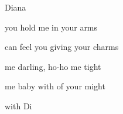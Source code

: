\begin{SBSong}{Diana}
\begin{SBVerse}
	 you hold me in your  arms
	
	 can feel you giving  your charms

	 me darling, ho-ho  me tight
	
	 me baby with  of your might
	
	   with  Di
  \end{SBVerse}
\end{SBSong}
